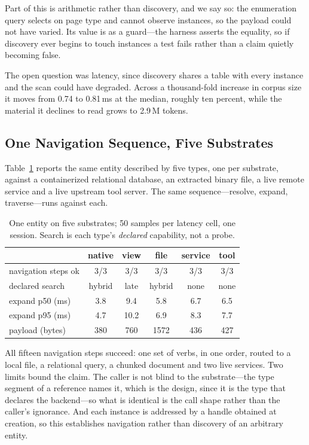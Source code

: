 \documentclass[journal,nofonttune]{IEEEtran}
\begin{document}
Part of this is arithmetic rather than discovery, and we say so: the
enumeration query selects on page type and cannot observe instances, so the
payload could not have varied. Its value is as a guard---the harness asserts
the equality, so if discovery ever begins to touch instances a test fails
rather than a claim quietly becoming false.

The open question was latency, since discovery shares a table with every
instance and the scan could have degraded. Across a thousand-fold increase in
corpus size it moves from 0.74 to 0.81\,ms at the median, roughly ten
percent, while the material it declines to read grows to 2.9\,M tokens.

\subsection{One Navigation Sequence, Five Substrates}
Table~\ref{tab:substrates} reports the same entity described by five types,
one per substrate, against a containerized relational database, an extracted
binary file, a live remote service and a live upstream tool server. The same
sequence---resolve, expand, traverse---runs against each.

\begin{table}[!t]
\caption{One entity on five substrates; 50 samples per latency cell, one
session. Search is each type's \emph{declared} capability, not a probe.}
\label{tab:substrates}
\centering
\footnotesize
\setlength{\tabcolsep}{3pt}
\begin{tabular}{lccccc}
\toprule
 & native & view & file & service & tool \\
\midrule
navigation steps ok & 3/3 & 3/3 & 3/3 & 3/3 & 3/3 \\
declared search     & hybrid & late & hybrid & none & none \\
expand p50 (ms)     & 3.8 & 9.4 & 5.8 & 6.7 & 6.5 \\
expand p95 (ms)     & 4.7 & 10.2 & 6.9 & 8.3 & 7.7 \\
payload (bytes)     & 380 & 760 & 1572 & 436 & 427 \\
\bottomrule
\end{tabular}
\end{table}

All fifteen navigation steps succeed: one set of verbs, in one order, routed
to a local file, a relational query, a chunked document and two live
services. Two limits bound the claim. The caller is not blind to the
substrate---the type segment of a reference names it, which is the design,
since it is the type that declares the backend---so what is identical is the
call shape rather than the caller's ignorance. And each instance is addressed
by a handle obtained at creation, so this establishes navigation rather than
discovery of an arbitrary entity.
\end{document}
